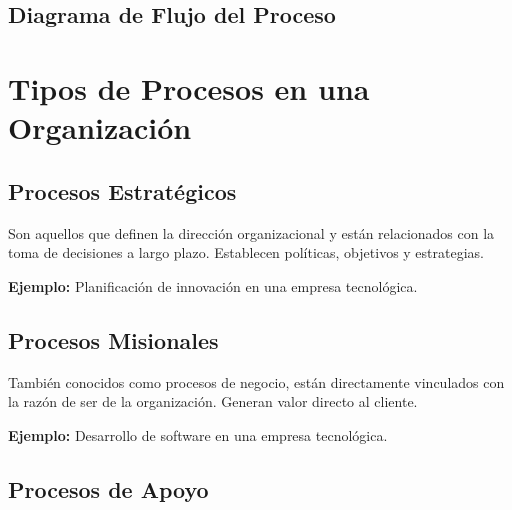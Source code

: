 \documentclass[12pt,a4paper]{article}
\begin{document}
\subsection{Diagrama de Flujo del Proceso}

\begin{center}
\end{center}

\section{Tipos de Procesos en una Organización}

\subsection{Procesos Estratégicos}

Son aquellos que definen la dirección organizacional y están relacionados con la toma de decisiones a largo plazo. Establecen políticas, objetivos y estrategias.

\textbf{Ejemplo:} Planificación de innovación en una empresa tecnológica.

\subsection{Procesos Misionales}

También conocidos como procesos de negocio, están directamente vinculados con la razón de ser de la organización. Generan valor directo al cliente.

\textbf{Ejemplo:} Desarrollo de software en una empresa tecnológica.

\subsection{Procesos de Apoyo}
\end{document}
